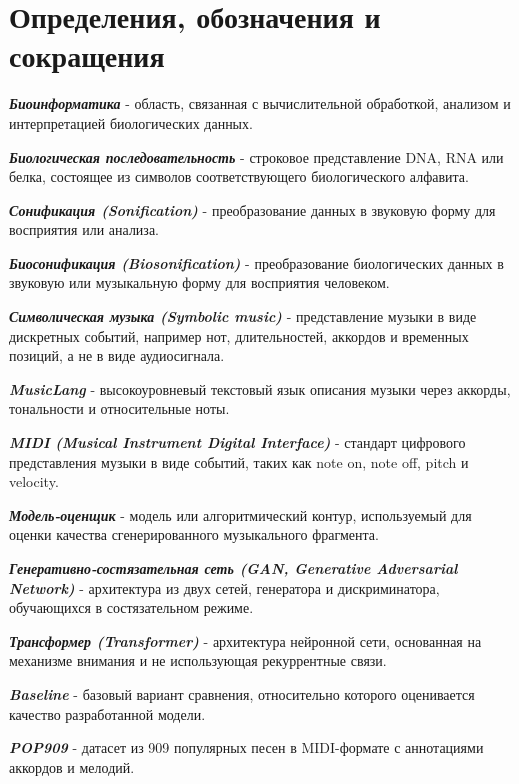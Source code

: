 \chapter*{Определения, обозначения и сокращения}

\newcommand{\glossitem}[2]{\textbf{\textit{#1}} - #2\par}

\glossitem{Биоинформатика}{область, связанная с вычислительной обработкой, анализом и интерпретацией биологических данных.}

\glossitem{Биологическая последовательность}{строковое представление DNA, RNA или белка, состоящее из символов соответствующего биологического алфавита.}

\glossitem{Сонификация (Sonification)}{преобразование данных в звуковую форму для восприятия или анализа.}

\glossitem{Биосонификация (Biosonification)}{преобразование биологических данных в звуковую или музыкальную форму для восприятия человеком.}

\glossitem{Символическая музыка (Symbolic music)}{представление музыки в виде дискретных событий, например нот, длительностей, аккордов и временных позиций, а не в виде аудиосигнала.}

\glossitem{MusicLang}{высокоуровневый текстовый язык описания музыки через аккорды, тональности и относительные ноты.}

\glossitem{MIDI (Musical Instrument Digital Interface)}{стандарт цифрового представления музыки в виде событий, таких как note on, note off, pitch и velocity.}

\glossitem{Модель-оценщик}{модель или алгоритмический контур, используемый для оценки качества сгенерированного музыкального фрагмента.}

\glossitem{Генеративно-состязательная сеть (GAN, Generative Adversarial Network)}{архитектура из двух сетей, генератора и дискриминатора, обучающихся в состязательном режиме.}

\glossitem{Трансформер (Transformer)}{архитектура нейронной сети, основанная на механизме внимания и не использующая рекуррентные связи.}

\glossitem{Baseline}{базовый вариант сравнения, относительно которого оценивается качество разработанной модели.}

\glossitem{POP909}{датасет из 909 популярных песен в MIDI-формате с аннотациями аккордов и мелодий.}

